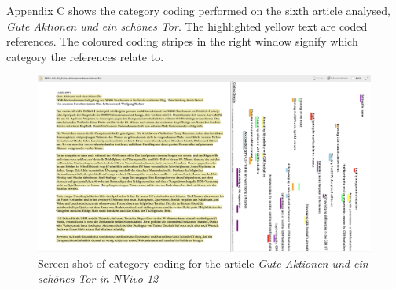 Appendix C shows the category coding performed on the sixth article analysed, \textit{Gute Aktionen und ein schönes Tor}. The highlighted yellow text are coded references. The coloured coding stripes in the right window signify which category the references relate to. 

\begin{landscape}
\begin{figure}[h]
\centering
\bigskip\bigskip\bigskip
\caption{Screen shot of category coding for the article \textit{Gute Aktionen und ein schönes Tor in NVivo 12}}
\includegraphics[width=\linewidth]{mres/images/appendix/c1.png}
\end{figure}
\end{landscape}
